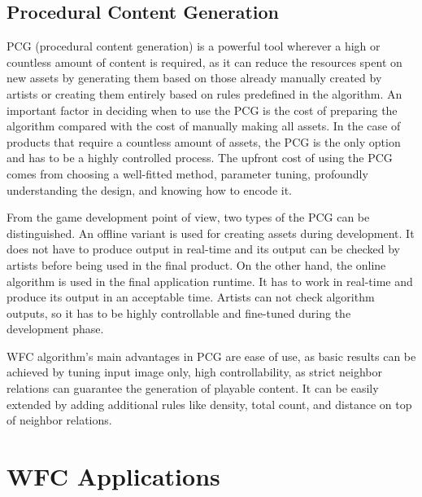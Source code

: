 \documentclass[shortabstract, english, inz]{iithesis}
\begin{document}
\section{Procedural Content Generation}
PCG (procedural content generation) is a powerful tool wherever a high or countless amount of content is required, as it can reduce the resources spent on new assets by generating them based on those already manually created by artists or creating them entirely based on rules predefined in the algorithm. An important factor in deciding when to use the PCG is the cost of preparing the algorithm compared with the cost of manually making all assets. In the case of products that require a countless amount of assets, the PCG is the only option and has to be a highly controlled process. The upfront cost of using the PCG comes from choosing a well-fitted method, parameter tuning, profoundly understanding the design, and knowing how to encode it.


From the game development point of view, two types of the PCG can be distinguished. An offline variant is used for creating assets during development. It does not have to produce output in real-time and its output can be checked by artists before being used in the final product. On the other hand, the online algorithm is used in the final application runtime. It has to work in real-time and produce its output in an acceptable time. Artists can not check algorithm outputs, so it has to be highly controllable and fine-tuned during the development phase. \cite{DesignLevelConstraints}


WFC algorithm's main advantages in PCG are ease of use, as basic results can be achieved by tuning input image only, high controllability, as strict neighbor relations can guarantee the generation of playable content. It can be easily extended by adding additional rules like density, total count, and distance on top of neighbor relations. \cite{Smith, DesignLevelConstraints}



\chapter{WFC Applications}
\label{chapter2}
\end{document}
